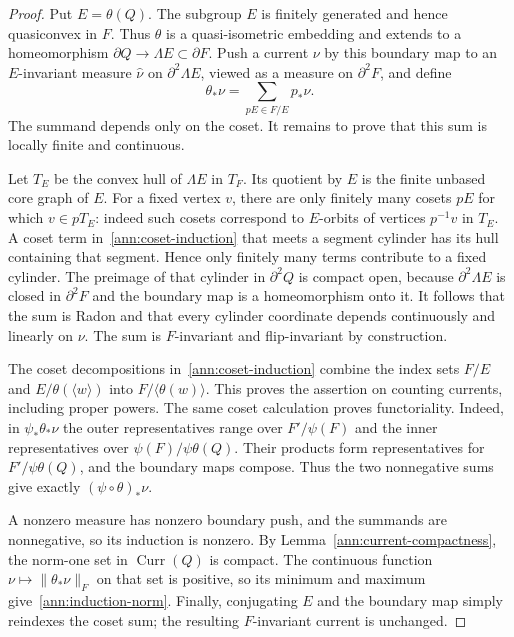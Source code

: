 \begin{proof}
Put $E=\theta(Q)$.  The subgroup $E$ is finitely generated and hence
quasiconvex in $F$.  Thus $\theta$ is a quasi-isometric embedding and
extends to a homeomorphism $\partial Q\to\Lambda E\subset\partial F$.
Push a current $\nu$ by this boundary map to an $E$-invariant measure
$\widehat\nu$ on $\partial^2\Lambda E$, viewed as a measure on
$\partial^2F$, and define
\begin{equation}
 \theta_*\nu=\sum_{pE\in F/E}p_*\widehat\nu.
 \label{ann:coset-induction}
\end{equation}
The summand depends only on the coset.  It remains to prove that this
sum is locally finite and continuous.

Let $T_E$ be the convex hull of $\Lambda E$ in $T_F$.  Its quotient
by $E$ is the finite unbased core graph of $E$.  For a fixed vertex
$v$, there are only finitely many cosets $pE$ for which $v\in pT_E$:
indeed such cosets correspond to $E$-orbits of vertices $p^{-1}v$ in
$T_E$.  A coset term in~\eqref{ann:coset-induction} that meets a
segment cylinder has its hull containing that segment.  Hence only
finitely many terms contribute to a fixed cylinder.  The preimage of
that cylinder in $\partial^2Q$ is compact open, because
$\partial^2\Lambda E$ is closed in $\partial^2F$ and the boundary
map is a homeomorphism onto it.  It follows that the sum is Radon
and that every cylinder coordinate depends continuously and linearly
on $\nu$.  The sum is $F$-invariant and flip-invariant by construction.

The coset decompositions in~\eqref{ann:coset-induction} combine the
index sets $F/E$ and $E/\theta(\langle w\rangle)$ into
$F/\langle\theta(w)\rangle$.  This proves the assertion on counting
currents, including proper powers.  The same coset calculation proves
functoriality.  Indeed, in $\psi_*\theta_*\nu$ the outer representatives
range over $F'/\psi(F)$ and the inner representatives over
$\psi(F)/\psi\theta(Q)$.  Their products form representatives for
$F'/\psi\theta(Q)$, and the boundary maps compose.  Thus the two
nonnegative sums give exactly $(\psi\circ\theta)_*\nu$.

A nonzero measure has nonzero
boundary push, and the summands are nonnegative, so its induction is
nonzero.  By Lemma~\ref{ann:current-compactness}, the norm-one set
in $\operatorname{Curr}(Q)$ is compact.  The continuous function
$\nu\mapsto\|\theta_*\nu\|_F$ on that set is positive, so its
minimum and maximum give~\eqref{ann:induction-norm}.  Finally,
conjugating $E$ and the boundary map simply reindexes the coset sum;
the resulting $F$-invariant current is unchanged.
\end{proof}


